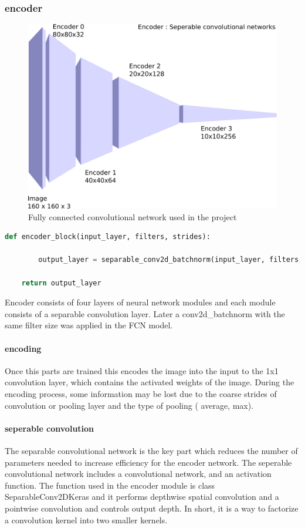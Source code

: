 \documentclass[paper=a4, fontsize=11pt]{scrartcl} %
\numberwithin{equation}{section} %
\numberwithin{figure}{section} %
\numberwithin{table}{section} %
\begin{document}
\subsubsection{encoder}
\begin{figure}[htp]
	\centering
	\includegraphics[scale=0.2]{./imgs/encoder.png}
	\caption{Fully connected convolutional network used in the project}
	\label{fig:encoder}
\end{figure}
\begin{lstlisting}[language=Python, caption= Endcoder block code]
	def encoder_block(input_layer, filters, strides):

		output_layer = separable_conv2d_batchnorm(input_layer, filters, strides)

    return output_layer
\end{lstlisting}
Encoder consists of four layers of neural network modules and each module consists of a separable convolution layer. Later a conv2d\_batchnorm with the same filter size was applied in the FCN model. 
\paragraph{encoding} Once this parts are trained this encodes the image into the input to the 1x1 convolution layer, which contains the activated weights of the image. During the encoding process, some information may be lost due to the coarse strides of convolution or pooling layer and the type of pooling ( average, max).

\paragraph{seperable convolution} The separable convolutional network is the key part which reduces the number of parameters needed to increase efficiency for the encoder network. The seperable convolutional network includes a convolutional network, and an activation function.
The function used in the encoder module is class SeparableConv2DKeras and it performs depthwise spatial convolution and a pointwise convolution and controls output depth. In short, it is a way to factorize a convolution kernel into two smaller kernels.
\end{document}

